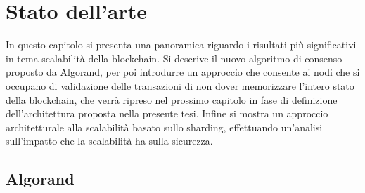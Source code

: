 \chapter{Stato dell'arte}

In questo capitolo si presenta una panoramica riguardo i risultati più significativi in tema scalabilità della blockchain. Si descrive il nuovo algoritmo di consenso proposto da Algorand, per poi introdurre un approccio che consente ai nodi che si occupano di validazione delle transazioni di non dover memorizzare l'intero stato della blockchain, che verrà ripreso nel prossimo capitolo in fase di definizione dell'architettura proposta nella presente tesi. Infine si mostra un approccio architetturale alla scalabilità basato sullo sharding, effettuando un'analisi sull'impatto che la scalabilità ha sulla sicurezza.


\section{Algorand}

